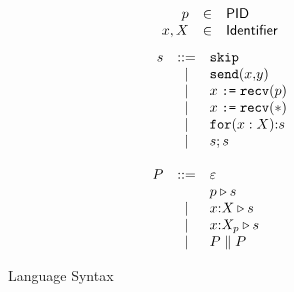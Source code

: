 \begin{figure}[h!]
\[
\begin{array}{rcl}
p & \in &\mathsf{PID}\\
x,X & \in &\mathsf{Identifier}\\
\end{array}
\]
\[
\begin{array}{rcl}
  s & ::=  & \mathtt{skip} \\
    & \;|\; & \mathtt{send(}x\mathtt{,}y\mathtt{)} \\
    & \;|\; & x \mathrel{\texttt{:=}} \mathtt{recv(}p\mathtt{)} \\
    & \;|\; & x \mathrel{\texttt{:=}} \mathtt{recv(}\mathtt{*}\mathtt{)} \\
    & \;|\; & \mathtt{for(}x:X\mathtt{)}\mathtt{:} s \\
    & \;|\; & s;s \\
    \\ 
  P & ::=  & \varepsilon \\
    &      & p \triangleright s\\
    & \;|\; & x{:}{X} \triangleright s\\
    & \;|\; & x{:}{{X}_{p}} \triangleright s\\
    & \;|\; & P \mathrel{\|} P
\end{array}
\]
\caption{Language Syntax}
\end{figure}
